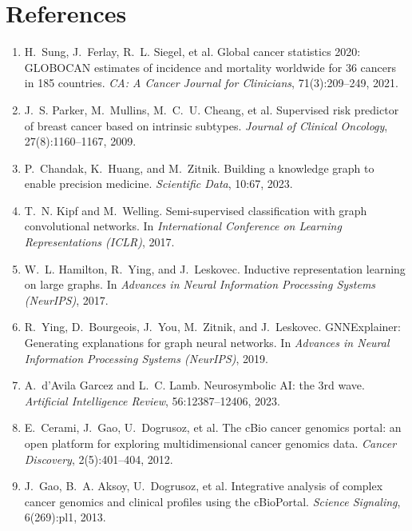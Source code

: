 \documentclass{mnnit}
\makeatletter
\newcommand{\rc}[1]{[\def\rc@sep{}\@for\rc@key:=#1\do{\rc@sep\ref{ref:\rc@key}\def\rc@sep{, }}]}
\makeatother
\begin{document}
\renewcommand{\baselinestretch}{1.1}\normalsize
\chapter*{References}
\renewcommand{\labelenumi}{[\arabic{enumi}]}
\begin{enumerate}
\small
\item\label{ref:globocan} H.~Sung, J.~Ferlay, R.~L. Siegel, et al. Global cancer statistics 2020: GLOBOCAN estimates of incidence and mortality worldwide for 36 cancers in 185 countries. \emph{CA: A Cancer Journal for Clinicians}, 71(3):209--249, 2021.
\item\label{ref:pam50} J.~S. Parker, M.~Mullins, M.~C.~U. Cheang, et al. Supervised risk predictor of breast cancer based on intrinsic subtypes. \emph{Journal of Clinical Oncology}, 27(8):1160--1167, 2009.
\item\label{ref:primekg} P.~Chandak, K.~Huang, and M.~Zitnik. Building a knowledge graph to enable precision medicine. \emph{Scientific Data}, 10:67, 2023.
\item\label{ref:gcn} T.~N. Kipf and M.~Welling. Semi-supervised classification with graph convolutional networks. In \emph{International Conference on Learning Representations (ICLR)}, 2017.
\item\label{ref:graphsage} W.~L. Hamilton, R.~Ying, and J.~Leskovec. Inductive representation learning on large graphs. In \emph{Advances in Neural Information Processing Systems (NeurIPS)}, 2017.
\item\label{ref:gnnexplainer} R.~Ying, D.~Bourgeois, J.~You, M.~Zitnik, and J.~Leskovec. GNNExplainer: Generating explanations for graph neural networks. In \emph{Advances in Neural Information Processing Systems (NeurIPS)}, 2019.
\item\label{ref:neurosymbolic} A.~d'Avila Garcez and L.~C. Lamb. Neurosymbolic AI: the 3rd wave. \emph{Artificial Intelligence Review}, 56:12387--12406, 2023.
\item\label{ref:cbioportal} E.~Cerami, J.~Gao, U.~Dogrusoz, et al. The cBio cancer genomics portal: an open platform for exploring multidimensional cancer genomics data. \emph{Cancer Discovery}, 2(5):401--404, 2012.
\item\label{ref:cbioportal2} J.~Gao, B.~A. Aksoy, U.~Dogrusoz, et al. Integrative analysis of complex cancer genomics and clinical profiles using the cBioPortal. \emph{Science Signaling}, 6(269):pl1, 2013.

\end{enumerate}
\end{document}

